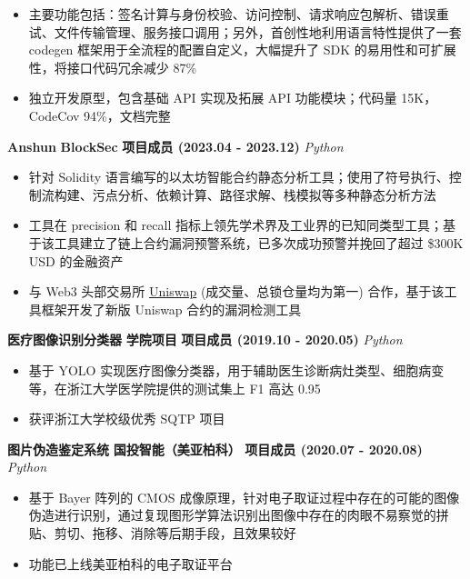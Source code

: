     \begin{itemize}
        \item 主要功能包括：签名计算与身份校验、访问控制、请求响应包解析、错误重试、文件传输管理、服务接口调用；另外，首创性地利用语言特性提供了一套 codegen 框架用于全流程的配置自定义，大幅提升了 SDK 的易用性和可扩展性，将接口代码冗余减少 87\%
        \item 独立开发原型，包含基础 API 实现及拓展 API 功能模块；代码量 15K，CodeCov 94\%，文档完整
    \end{itemize}

    \noindent \textbf{Anshun} \textbar{} \textbf{BlockSec} \textbar{} \textbf{项目成员 (2023.04 - 2023.12)} \hfill \textsl{Python}

    \begin{itemize}
        \item 针对 Solidity 语言编写的以太坊智能合约静态分析工具；使用了符号执行、控制流构建、污点分析、依赖计算、路径求解、栈模拟等多种静态分析方法
        \item 工具在 precision 和 recall 指标上领先学术界及工业界的已知同类型工具；基于该工具建立了链上合约漏洞预警系统，已多次成功预警并挽回了超过 \$300K USD 的金融资产
        \item 与 Web3 头部交易所 \href{https://defillama.com/protocols/Dexes}{Uniswap} (成交量、总锁仓量均为第一) 合作，基于该工具框架开发了新版 Uniswap 合约的漏洞检测工具
    \end{itemize}

    \ifdefined\qr

        \noindent \textbf{医疗图像识别分类器} \textbar{} \textbf{学院项目} \textbar{} \textbf{项目成员 (2019.10 - 2020.05)} \hfill \textsl{Python}

        \begin{itemize}
            \item 基于 YOLO 实现医疗图像分类器，用于辅助医生诊断病灶类型、细胞病变等，在浙江大学医学院提供的测试集上 F1 高达 0.95
            \item 获评浙江大学校级优秀 SQTP 项目
        \end{itemize}

        \noindent \textbf{图片伪造鉴定系统} \textbar{} \textbf{国投智能（美亚柏科）} \textbar{} \textbf{项目成员 (2020.07 - 2020.08)} \hfill \textsl{Python}

        \begin{itemize}
            \item 基于 Bayer 阵列的 CMOS 成像原理，针对电子取证过程中存在的可能的图像伪造进行识别，通过复现图形学算法识别出图像中存在的肉眼不易察觉的拼贴、剪切、拖移、消除等后期手段，且效果较好
            \item 功能已上线美亚柏科的电子取证平台
        \end{itemize}

